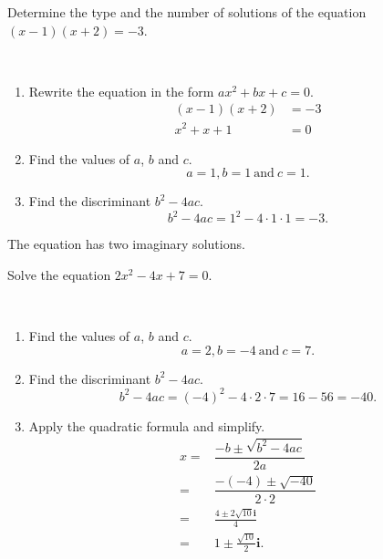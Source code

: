 \documentclass[
  en,11pt]{elegantbook}
\newcommand{\ii}{\mathbf{i}}
\let\BeginKnitrBlock\begin \let\EndKnitrBlock\end
\begin{document}
\BeginKnitrBlock{example}
\protect\hypertarget{exm:unnamed-chunk-130}{}{\label{exm:unnamed-chunk-130} }
Determine the type and the number of solutions of the equation \((x-1)(x+2)=-3\).
\EndKnitrBlock{example}

\BeginKnitrBlock{solution}
{}\\

\begin{enumerate}
\def\labelenumi{\arabic{enumi}.}

\item
  Rewrite the equation in the form \(ax^2+bx+c=0\).
  \[
       \begin{aligned}
           (x-1)(x+2)&=-3\\
           x^2+x+1&=0
       \end{aligned}
   \]
\item
  Find the values of \(a\), \(b\) and \(c\).
  \[
       a=1, b=1 ~\text{and}~ c=1.
   \]
\item
  Find the discriminant \(b^2-4ac\).
  \[
       b^2-4ac=1^2-4\cdot 1\cdot 1=-3.
   \]
\end{enumerate}

The equation has two imaginary solutions.
\EndKnitrBlock{solution}

\BeginKnitrBlock{example}
\protect\hypertarget{exm:unnamed-chunk-132}{}{\label{exm:unnamed-chunk-132} }
Solve the equation \(2x^2-4x+7=0\).
\EndKnitrBlock{example}

\BeginKnitrBlock{solution}
{}\\

\begin{enumerate}
\def\labelenumi{\arabic{enumi}.}

\item
  Find the values of \(a\), \(b\) and \(c\).
  \[
       a=2, b=-4 ~\text{and}~ c=7.
   \]
\item
  Find the discriminant \(b^2-4ac\).
  \[
       b^2-4ac=(-4)^2-4\cdot 2\cdot 7=16-56=-40.
   \]
\item
  Apply the quadratic formula and simplify.
  \[
   \begin{aligned}
       x=&\dfrac{-b\pm\sqrt{b^2-4ac}}{2a}\\
       =&\dfrac{-(-4)\pm\sqrt{-40}}{2\cdot 2}\\
       =&\frac{4\pm 2\sqrt{10} \ii}{4}\\
       =&1\pm\frac{\sqrt{10}}{2}\ii.
   \end{aligned}
   \]
\end{enumerate}
\EndKnitrBlock{solution}
\end{document}
